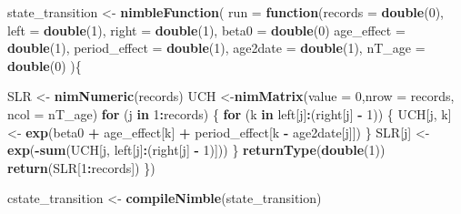 \documentclass[11pt,]{article}
\newenvironment{Shaded}{\begin{snugshade}}{\end{snugshade}}
\newcommand{\KeywordTok}[1]{\textcolor[rgb]{0.13,0.29,0.53}{\textbf{#1}}}
\newcommand{\DataTypeTok}[1]{\textcolor[rgb]{0.13,0.29,0.53}{#1}}
\newcommand{\DecValTok}[1]{\textcolor[rgb]{0.00,0.00,0.81}{#1}}
\newcommand{\StringTok}[1]{\textcolor[rgb]{0.31,0.60,0.02}{#1}}
\newcommand{\ControlFlowTok}[1]{\textcolor[rgb]{0.13,0.29,0.53}{\textbf{#1}}}
\newcommand{\OperatorTok}[1]{\textcolor[rgb]{0.81,0.36,0.00}{\textbf{#1}}}
\newcommand{\NormalTok}[1]{#1}
\begin{document}
\begin{Shaded}
\begin{Highlighting}[]
\NormalTok{state_transition <-}\StringTok{ }\KeywordTok{nimbleFunction}\NormalTok{(}
  \DataTypeTok{run =} \ControlFlowTok{function}\NormalTok{(}\DataTypeTok{records =} \KeywordTok{double}\NormalTok{(}\DecValTok{0}\NormalTok{),}
                 \DataTypeTok{left =} \KeywordTok{double}\NormalTok{(}\DecValTok{1}\NormalTok{),}
                 \DataTypeTok{right =} \KeywordTok{double}\NormalTok{(}\DecValTok{1}\NormalTok{),}
                 \DataTypeTok{beta0 =} \KeywordTok{double}\NormalTok{(}\DecValTok{0}\NormalTok{)}
                 \DataTypeTok{age_effect =} \KeywordTok{double}\NormalTok{(}\DecValTok{1}\NormalTok{),}
                 \DataTypeTok{period_effect =} \KeywordTok{double}\NormalTok{(}\DecValTok{1}\NormalTok{),}
                 \DataTypeTok{age2date =} \KeywordTok{double}\NormalTok{(}\DecValTok{1}\NormalTok{),}
                 \DataTypeTok{nT_age =} \KeywordTok{double}\NormalTok{(}\DecValTok{0}\NormalTok{)}
\NormalTok{  )\{}

\NormalTok{    SLR <-}\StringTok{ }\KeywordTok{nimNumeric}\NormalTok{(records)}
\NormalTok{    UCH <-}\KeywordTok{nimMatrix}\NormalTok{(}\DataTypeTok{value =} \DecValTok{0}\NormalTok{,}\DataTypeTok{nrow =}\NormalTok{ records, }\DataTypeTok{ncol =}\NormalTok{ nT_age)}
    \ControlFlowTok{for}\NormalTok{ (j }\ControlFlowTok{in} \DecValTok{1}\OperatorTok{:}\NormalTok{records) \{}
      \ControlFlowTok{for}\NormalTok{ (k }\ControlFlowTok{in}\NormalTok{ left[j]}\OperatorTok{:}\NormalTok{(right[j] }\OperatorTok{-}\StringTok{ }\DecValTok{1}\NormalTok{)) \{}
\NormalTok{        UCH[j, k] <-}\StringTok{ }\KeywordTok{exp}\NormalTok{(beta0 }\OperatorTok{+}
\StringTok{                         }\NormalTok{age_effect[k] }\OperatorTok{+}
\StringTok{                         }\NormalTok{period_effect[k }\OperatorTok{-}\StringTok{ }\NormalTok{age2date[j]])}
\NormalTok{      \}}
\NormalTok{      SLR[j] <-}\StringTok{ }\KeywordTok{exp}\NormalTok{(}\OperatorTok{-}\KeywordTok{sum}\NormalTok{(UCH[j, left[j]}\OperatorTok{:}\NormalTok{(right[j] }\OperatorTok{-}\StringTok{ }\DecValTok{1}\NormalTok{)]))}
\NormalTok{    \}}
    \KeywordTok{returnType}\NormalTok{(}\KeywordTok{double}\NormalTok{(}\DecValTok{1}\NormalTok{))}
    \KeywordTok{return}\NormalTok{(SLR[}\DecValTok{1}\OperatorTok{:}\NormalTok{records])}
\NormalTok{  \})}

\NormalTok{cstate_transition <-}\StringTok{ }\KeywordTok{compileNimble}\NormalTok{(state_transition)}
\end{Highlighting}
\end{Shaded}
\end{document}
